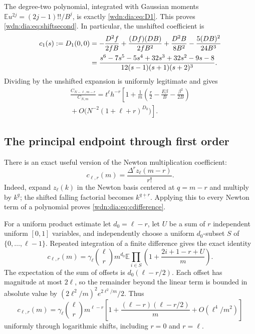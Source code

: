 \documentclass[11pt,letterpaper]{article}
\theoremstyle{remark}\newtheorem{remark}[theorem]{Remark}
\newcommand{\fall}[2]{#1^{\underline{#2}}}
\newcommand{\E}{\mathbb E}
\begin{document}
The degree-two polynomial, integrated with Gaussian moments
$\E u^{2j}=(2j-1)!!/B^j$, is exactly \eqref{wdn:dia:eq:D1}. This proves
\eqref{wdn:dia:eq:shiftsecond}. In particular, the unshifted coefficient is
\begin{align}
 c_1(s):=D_1(0,0)
 &=-\frac{D^2f}{2fB}+\frac{(Df)(DB)}{2fB^2}
   +\frac{D^2B}{8B^2}-\frac{5(DB)^2}{24B^3}\notag\\
 &=\frac{s^6-7s^5-5s^4+32s^3+32s^2-9s-8}
 {12(s-1)(s+1)(s+2)^3}.\label{wdn:dia:eq:c1}
\end{align}
Dividing by the unshifted expansion is uniformly legitimate and gives
\begin{multline}\label{wdn:dia:eq:ratiosecond}
 \frac{C_{N-\ell,m-r}}{C_{N,m}}=t^\ell h^{-r}
 \left[1+\frac1m\left(\frac r2-\frac{E\beta}{B}
                         -\frac{\beta^2}{2B}\right)\right.
 \\\left.{}+O\bigl(N^{-2}(1+\ell+r)^{D_0}\bigr)\right].
\end{multline}

\subsection{The principal endpoint through first order}
There is an exact useful version of the Newton multiplication coefficient:
\begin{equation}\label{wdn:dia:eq:cdifference}
 c_{\ell,r}(m)=\frac{\Delta^r z_\ell(m-r)}{r!}.
\end{equation}
Indeed, expand $z_\ell(k)$ in the Newton basis centered at $q=m-r$ and
multiply by $\fall{k}{q}$; the shifted falling factorial becomes
$\fall{k}{q+r}$. Applying this to every Newton term of a polynomial proves
\eqref{wdn:dia:eq:cdifference}.

For a uniform product estimate let $d_0=\ell-r$, let $U$ be a sum of $r$
independent uniform $[0,1]$ variables, and independently choose a uniform
$d_0$-subset $S$ of $\{0,\ldots,\ell-1\}$. Repeated integration of a finite
difference gives the exact identity
\begin{equation}\label{wdn:dia:eq:operatorint}
 c_{\ell,r}(m)=\gamma_\ell\binom\ell r m^{d_0}
 \E\prod_{i\in S}\left(1+\frac{2i+1-r+U}{m}\right).
\end{equation}
The expectation of the sum of offsets is
$d_0(\ell-r/2)$. Each offset has magnitude at most $2\ell$, so the
remainder beyond the linear term is bounded in absolute value by
$(2\ell^2/m)^2e^{2\ell^2/m}/2$. Thus
\begin{equation}\label{wdn:dia:eq:csecond}
 c_{\ell,r}(m)=\gamma_\ell\binom\ell r m^{\ell-r}
 \left[1+\frac{(\ell-r)(\ell-r/2)}m+O(\ell^4/m^2)\right]
\end{equation}
uniformly through logarithmic shifts, including $r=0$ and $r=\ell$.
\end{document}
